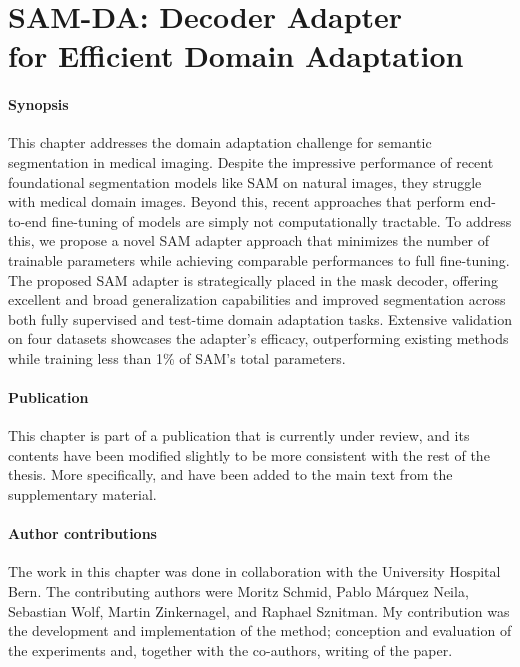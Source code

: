 \graphicspath{{ch4_sam_da/}{Figures/}}

\chapter{SAM-DA: Decoder Adapter \\for Efficient Domain Adaptation}
\label{chapter:samda}


\subsubsection{Synopsis}This chapter addresses the domain adaptation challenge for semantic segmentation in medical imaging. Despite the impressive performance of recent foundational segmentation models like SAM on natural images, they struggle with medical domain images. Beyond this, recent approaches that perform end-to-end fine-tuning of models are simply not computationally tractable. To address this, we propose a novel SAM adapter approach that minimizes the number of trainable parameters while achieving comparable performances to full fine-tuning. The proposed SAM adapter is strategically placed in the mask decoder, offering excellent and broad generalization capabilities and improved segmentation across both fully supervised and test-time domain adaptation tasks. Extensive validation on four datasets showcases the adapter's efficacy, outperforming existing methods while training less than 1\% of SAM's total parameters.

\subsubsection{Publication}This chapter is part of a publication that is currently under review, and its contents have been modified slightly to be more consistent with the rest of the thesis. More specifically,  and  have been added to the main text from the supplementary material.

\subsubsection{Author contributions}The work in this chapter was done in collaboration with the University Hospital Bern. The contributing authors were Moritz Schmid, Pablo Márquez Neila, Sebastian Wolf, Martin Zinkernagel, and Raphael Sznitman. My contribution was the development and implementation of the method; conception and evaluation of the experiments and, together with the co-authors, writing of the paper.






